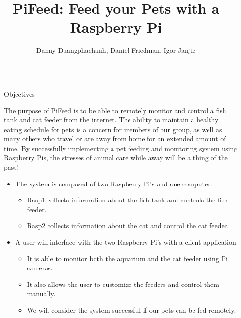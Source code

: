 \documentclass[final]{beamer}
\title{PiFeed: Feed your Pets with a Raspberry Pi} %
\author{Danny Duangphachanh, Daniel Friedman, Igor Janjic} %
\institute{Bradley Department of Electrical and Computer Engineering, Virginia Tech [ECE 4564]} %
\newlength{\sepwid}
\newlength{\onecolwid}
\begin{document}

\setlength{\belowcaptionskip}{2ex} %
\setlength\belowdisplayshortskip{2ex} %

\begin{frame}[t] %

\begin{columns}[t] %

\begin{column}{\sepwid}\end{column} %

\begin{column}{\onecolwid} %


\begin{alertblock}{Objectives}

The purpose of PiFeed is to be able to remotely monitor and control a fish tank
and cat feeder from the internet. The ability to maintain a healthy
eating schedule for pets is a concern for members of our group, as well as many
others who travel or are away from home for an extended amount of time. By
successfully implementing a pet feeding and monitoring system using Raspberry
Pis, the stresses of animal care while away will be a thing of the past!
\begin{itemize}
    \item The system is composed of two Raspberry Pi's and one computer.
    \begin{itemize}
        \item Rasp1 collects information about the fish tank and controls the fish
        feeder.
        \item Rasp2 collects information about the cat and control the cat
        feeder.
    \end{itemize}
    \item A user will interface with the two Raspberry Pi's with a client
    application
    \begin{itemize}
        \item It is able to monitor both the aquarium and the cat feeder
        using Pi cameras.
        \item It also allows the user to customize the feeders and control them manually.
    \item We will consider the system successful if our pets can be fed
    remotely.
    \end{itemize}
\end{itemize}


\end{alertblock}
\end{column}
\end{columns}
\end{frame}
\end{document}
